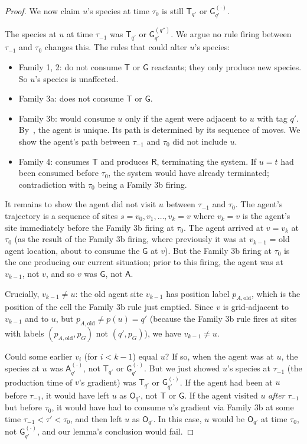 \documentclass[11pt]{article}
\theoremstyle{plain}
\theoremstyle{definition}
\theoremstyle{remark}
\begin{document}
\begin{proof}
We now claim $u$'s species at time $\tau_0$ is still $\mathsf{T}_{q'}$ or $\mathsf{G}^{(\cdot)}_{q'}$.

The species at $u$ at time $\tau_{-1}$ was $\mathsf{T}_{q'}$ or $\mathsf{G}^{(q'')}_{q'}$. We argue no rule firing between $\tau_{-1}$ and $\tau_0$ changes this. The rules that could alter $u$'s species:
\begin{itemize}
    \item Family 1, 2: do not consume $\mathsf{T}$ or $\mathsf{G}$ reactants; they only produce new species. So $u$'s species is unaffected.
    \item Family 3a: does not consume $\mathsf{T}$ or $\mathsf{G}$.
    \item Family 3b: would consume $u$ only if the agent were adjacent to $u$ with tag $q'$. By~, the agent is unique. Its path is determined by its sequence of moves. We show the agent's path between $\tau_{-1}$ and $\tau_0$ did not include $u$.
    \item Family 4: consumes $\mathsf{T}$ and produces $\mathsf{R}$, terminating the system. If $u = t$ had been consumed before $\tau_0$, the system would have already terminated; contradiction with $\tau_0$ being a Family 3b firing.
\end{itemize}
It remains to show the agent did not visit $u$ between $\tau_{-1}$ and $\tau_0$. The agent's trajectory is a sequence of sites $s = v_0, v_1, \ldots, v_k = v$ where $v_k = v$ is the agent's site immediately before the Family 3b firing at $\tau_0$. The agent arrived at $v = v_k$ at $\tau_0$ (as the result of the Family 3b firing, where previously it was at $v_{k-1}$ = old agent location, about to consume the $\mathsf{G}$ at $v$). But the Family 3b firing at $\tau_0$ is the one producing our current situation; prior to this firing, the agent was at $v_{k-1}$, not $v$, and so $v$ was $\mathsf{G}$, not $\mathsf{A}$. 

Crucially, $v_{k-1} \neq u$: the old agent site $v_{k-1}$ has position label $p_{A,\mathrm{old}}$, which is the position of the cell the Family 3b rule just emptied. Since $v$ is grid-adjacent to $v_{k-1}$ and to $u$, but $p_{A,\mathrm{old}} \neq p(u) = q'$ (because the Family 3b rule fires at sites with labels $(p_{A,\mathrm{old}}, p_G)$ not $(q', p_G)$), we have $v_{k-1} \neq u$.

Could some earlier $v_i$ (for $i < k-1$) equal $u$? If so, when the agent was at $u$, the species at $u$ was $\mathsf{A}^{(\cdot)}_{q'}$, not $\mathsf{T}_{q'}$ or $\mathsf{G}^{(\cdot)}_{q'}$. But we just showed $u$'s species at $\tau_{-1}$ (the production time of $v$'s gradient) was $\mathsf{T}_{q'}$ or $\mathsf{G}^{(\cdot)}_{q'}$. If the agent had been at $u$ before $\tau_{-1}$, it would have left $u$ as $\mathsf{O}_{q'}$, not $\mathsf{T}$ or $\mathsf{G}$. If the agent visited $u$ \emph{after} $\tau_{-1}$ but before $\tau_0$, it would have had to consume $u$'s gradient via Family 3b at some time $\tau_{-1} < \tau' < \tau_0$, and then left $u$ as $\mathsf{O}_{q'}$. In this case, $u$ would be $\mathsf{O}_{q'}$ at time $\tau_0$, not $\mathsf{G}^{(\cdot)}_{q'}$, and our lemma's conclusion would fail.


\end{proof}
\end{document}
